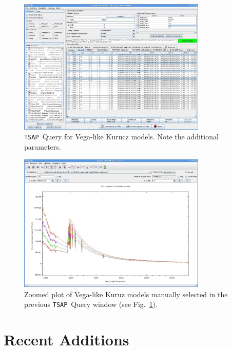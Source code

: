 \documentclass[final,authoryear,5p,times,twocolumn]{elsarticle}
\newcommand{\tsap}{\texttt{TSAP}}
\begin{document}
\begin{figure}[t]
\begin{center}
\includegraphics[width=0.8\textwidth]{TSSA-query.pdf}
\caption{\tsap\ Query for Vega-like Kurucz models. Note the additional parameters.}
\label{fig:TSAP-query}
\end{center}
\end{figure}


\begin{figure}[t]
\begin{center}
\includegraphics[width=0.8\textwidth]{TSSA-plot.pdf}
\caption{Zoomed plot of Vega-like Kuruz models manually selected in the previous
\tsap\ Query window (see Fig.~\ref{fig:TSAP-query}). }
\label{fig:TSAP-plot}
\end{center}
\end{figure}



\section{Recent Additions}
\end{document}
